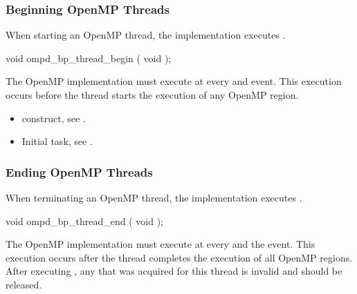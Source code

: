 \subsubsection{Beginning OpenMP Threads}
\label{subsubsec:ompd_bp_thread_begin}

\summary
When starting an OpenMP thread, the implementation executes
.

\format
\begin{cspecific}
\begin{ompSyntax}
void ompd_bp_thread_begin ( void );
\end{ompSyntax}
\end{cspecific}

\descr
The OpenMP implementation must execute  at 
every  and  event.
This execution occurs before the thread starts the execution of any 
OpenMP region.

\crossreferences
\begin{itemize}
\item {} construct, see .

\item Initial task, see .
\end{itemize}



\subsubsection{Ending OpenMP Threads}
\label{subsubsec:ompd_bp_thread_end}

\summary
When terminating an OpenMP thread, the implementation 
executes .

\format
\begin{cspecific}
\begin{ompSyntax}
void ompd_bp_thread_end ( void );
\end{ompSyntax}
\end{cspecific}

\descr
The OpenMP implementation must execute  
at every  and the  event.
This execution occurs after the thread completes the execution of 
all OpenMP regions. After executing , any 
 that was acquired for this thread is invalid 
and should be released.

